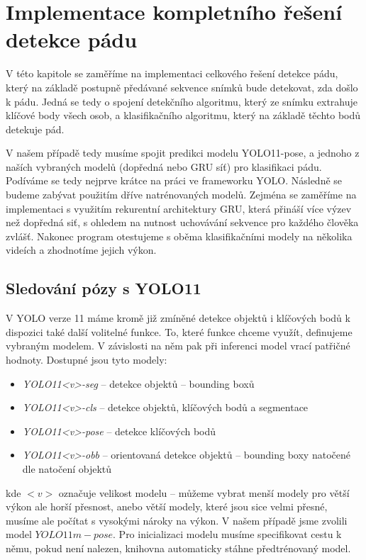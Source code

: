 \chapter{Implementace kompletního řešení detekce pádu}
\label{chap:detectionProgram}

V této kapitole se zaměříme na implementaci celkového řešení detekce pádu,
který na základě postupně předávané sekvence snímků bude detekovat, zda došlo k
pádu. Jedná se tedy o spojení detekčního algoritmu, který ze snímku extrahuje
klíčové body všech osob, a klasifikačního algoritmu, který na základě těchto
bodů detekuje pád.

V našem případě tedy musíme spojit predikci modelu YOLO11-pose, a jednoho z
naších vybraných modelů (dopředná nebo GRU síť) pro klasifikaci pádu. Podíváme
se tedy nejprve krátce na práci ve frameworku YOLO. Následně se budeme zabývat
použitím dříve natrénovaných modelů. Zejména se zaměříme na implementaci s
využitím rekurentní architektury GRU, která přináší více výzev než dopředná
siť, s ohledem na nutnost uchovávání sekvence pro každého člověka zvlášť.
Nakonec program otestujeme s oběma klasifikačními modely na několika videích a
zhodnotíme jejich výkon.

\section{Sledování pózy s YOLO11}

V YOLO verze 11 máme kromě již zmíněné detekce objektů i klíčových bodů k
dispozici také další volitelné funkce. To, které funkce chceme využít,
definujeme vybraným modelem. V závislosti na něm pak při inferenci model vrací
patřičné hodnoty. Dostupné jsou tyto modely:
\begin{itemize}
    \item \textit{YOLO11<v>-seg } – detekce objektů – bounding boxů
    \item \textit{YOLO11<v>-cls } – detekce objektů, klíčových bodů a segmentace
    \item \textit{YOLO11<v>-pose} – detekce klíčových bodů
    \item \textit{YOLO11<v>-obb } – orientovaná detekce objektů – bounding boxy natočené dle natočení objektů
\end{itemize}

kde $<v>$ označuje velikost modelu – můžeme vybrat menší modely pro větší výkon
ale horší přesnost, anebo větší modely, které jsou sice velmi přesné, musíme
ale počítat s vysokými nároky na výkon. V našem případě jsme zvolili model
$YOLO11m-pose$. Pro inicializaci modelu musíme specifikovat cestu k němu, pokud
není nalezen, knihovna automaticky stáhne předtrénovaný model.

